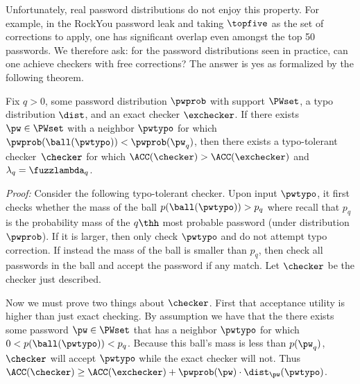 Unfortunately, real password distributions do not enjoy this property. For
example, in the RockYou password leak and taking $\topfive$ as the set of
corrections to apply, one has significant overlap even amongst the  top 50
passwords. We therefore ask: for the password distributions seen in practice, 
can one achieve checkers with free corrections? The answer is yes as formalized
by the following theorem.



\begin{theorem} Fix $q > 0$, some password distribution
$\pwprob$ with support $\PWset$, 
a typo distribution $\dist$, and an exact checker $\exchecker$.
If there exists $\pw \in \PWset$ with a neighbor $\pwtypo$ for which
$\pwprob(\ball(\pwtypo)) < \pwprob(\pw_q)$,  then there exists a typo-tolerant
checker~$\checker$
for which $\ACC(\checker) > \ACC(\exchecker)$ and $\lambda_q = \fuzzlambda_q$. 
\end{theorem}


\noindent\emph{Proof:}
Consider the following typo-tolerant checker. Upon input $\pwtypo$, it first
checks whether the mass of the ball $p(\ball(\pwtypo)) > p_q$ where recall that $p_q$ is the
probability mass of the $q\thh$ most probable password (under
distribution~$\pwprob$). If it is larger, then only check $\pwtypo$ and do not
attempt typo correction. If instead the mass of the ball is smaller than $p_q$,
then check all passwords in the ball and accept the password if any match. Let
$\checker$ be the checker just described. 

Now we must prove two things about $\checker$. First that acceptance utility is
higher than just exact checking.  By assumption we have that the there exists
some password $\pw \in \PWset$ that has a neighbor $\pwtypo$ for which $0 <
p(\ball(\pwtypo)) < p_q$. Because this ball's mass is less than $p(\pw_q)$,
 $\checker$ will accept $\pwtypo$ while the exact checker will not. 
Thus $\ACC(\checker) \ge \ACC(\exchecker) + \pwprob(\pw)\cdot \dist_\pw(\pwtypo)$. 




